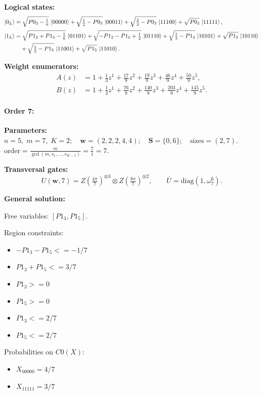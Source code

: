 \documentclass[11pt]{article}
\begin{document}
\noindent\textbf{Logical states:}
\begin{align*}
\ket{0_L} &= \sqrt{P0_3 - \tfrac{1}{6}}\,\ket{00000} + \sqrt{\tfrac{1}{2} - P0_3}\,\ket{00011} + \sqrt{\tfrac{2}{3} - P0_3}\,\ket{11100} + \sqrt{P0_3}\,\ket{11111},
\\[2pt]
\ket{1_L} &= \sqrt{P1_3 + P1_5 - \tfrac{1}{6}}\,\ket{01101} + \sqrt{-P1_3 - P1_5 + \tfrac{1}{2}}\,\ket{01110} + \sqrt{\tfrac{1}{3} - P1_3}\,\ket{10101} + \sqrt{P1_3}\,\ket{10110}\\
&\quad + \sqrt{\tfrac{1}{3} - P1_5}\,\ket{11001} + \sqrt{P1_5}\,\ket{11010}.
\end{align*}

\noindent\textbf{Weight enumerators:}
\begin{align*}
A(z) &= 1 + \tfrac{1}{3}z^{1} + \tfrac{17}{9}z^{2} + \tfrac{19}{9}z^{3} + \tfrac{46}{9}z^{4} + \tfrac{50}{9}z^{5},\\[2pt]
B(z) &= 1 + \tfrac{1}{3}z^{1} + \tfrac{76}{9}z^{2} + \tfrac{140}{9}z^{3} + \tfrac{203}{9}z^{4} + \tfrac{145}{9}z^{5}.
\end{align*}

\paragraph{\textbf{Order 7:}}
\noindent\textbf{Parameters:} $n=5,\; m=7,\; K=2;\quad \mathbf w=(2, 2, 2, 4, 4);\quad \mathbf S=\{0, 6\};\quad \text{sizes}=\left(2, 7\right).$ $\displaystyle \text{order}=\frac{m}{\gcd(m,s_1,\dots,s_{K-1})}=\frac{7}{1}=7.$

\noindent\textbf{Transversal gates:}
\[
    U(\mathbf w,7)=Z \left(\tfrac{4\pi}{7}\right)^{\otimes3} \otimes Z \left(\tfrac{8\pi}{7}\right)^{\otimes2},\qquad
    \overline U=\mathrm{diag}(1,\omega_{7}^{6}).
\]

\noindent\textbf{General solution:}

Free variables: $[P1_3, P1_5]$.

Region constraints:
\begin{itemize}
    \item $-P1_3 - P1_5 <= -1/7$
    \item $P1_3 + P1_5 <= 3/7$
    \item $P1_3 >= 0$
    \item $P1_5 >= 0$
    \item $P1_3 <= 2/7$
    \item $P1_5 <= 2/7$
\end{itemize}

Probabilities on $C0 (X)$:
\begin{itemize}
    \item $X_{00000} = 4/7$
    \item $X_{11111} = 3/7$
\end{itemize}
\end{document}
